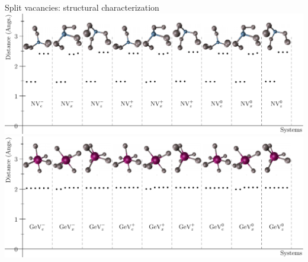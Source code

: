 
\begin{frame}{Split vacancies: structural characterization} %
  \centering
  \includegraphics[height=.5\textheight]{images/split/split_N.pdf}\\
  \includegraphics[height=.5\textheight]{images/split/split_Ge.pdf}
\end{frame}

